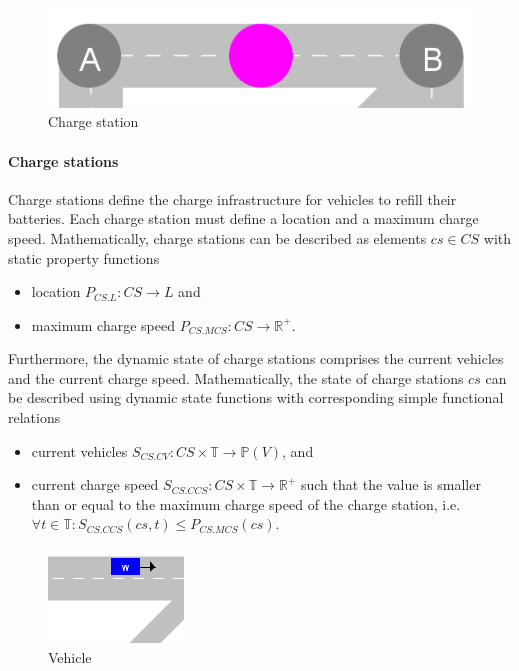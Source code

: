 \documentclass{IEEEtran}
\begin{document}
    \begin{figure}[htbp]
        \centering
        \includegraphics[scale=0.33]{../../concepts/charge-station.png}
        \caption{Charge station}
        \label{fig:charge-station}
    \end{figure}

    \paragraph{Charge stations}
    Charge stations define the charge infrastructure for vehicles to refill their batteries.
    Each charge station must define a location and a maximum charge speed.
    Mathematically, charge stations can be described as elements $cs \in CS$ with static property functions
    \begin{itemize}
        \item location $P_{CS.L}: CS \rightarrow L$ and
        \item maximum charge speed $P_{CS.MCS}: CS \rightarrow \mathbb{R}^+$.
    \end{itemize}
    Furthermore, the dynamic state of charge stations comprises the current vehicles and the current charge speed.
    Mathematically, the state of charge stations $cs$ can be described using dynamic state functions with corresponding simple functional relations
    \begin{itemize}
        \item current vehicles $S_{CS.CV}: CS \times \mathbb{T} \rightarrow \mathbb{P}(V)$, and
        \item current charge speed $S_{CS.CCS}: CS \times \mathbb{T} \rightarrow \mathbb{R}^+$ such that the value is smaller than or equal to the maximum charge speed of the charge station, i.e.\ $\forall t \in \mathbb{T}: S_{CS.CCS}(cs,t) \leq P_{CS.MCS}(cs)$.
    \end{itemize}

    \begin{figure}[htbp]
        \centering
        \includegraphics[scale=0.5]{../../concepts/vehicle.png}
        \caption{Vehicle}
        \label{fig:vehicle}
    \end{figure}
\end{document}
